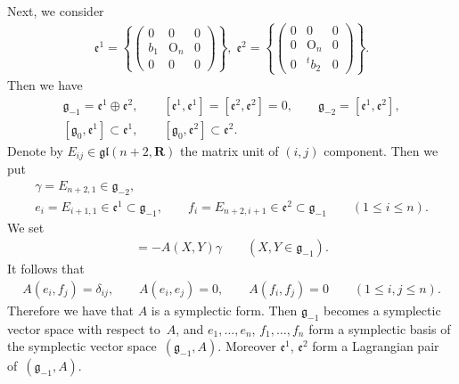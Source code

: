 Next, we consider
\begin{gather*}  \mathfrak{e}^1=\left\{{\begin{pmatrix}
                      0 & 0 & 0 \\
                      b_1 & \mathrm{O}_n & 0 \\
                      0 & 0 & 0
                    \end{pmatrix}}\right\}, \;
  \mathfrak{e}^2=\left\{{\begin{pmatrix}
                      0 & 0 & 0 \\
                      0 & \mathrm{O}_n & 0 \\
                      0 & {}^tb_2 & 0
                     \end{pmatrix}}\right\}.
\end{gather*}
Then we have
\begin{gather*}
\mathfrak{g}_{-1}=\mathfrak{e}^1\oplus \mathfrak{e}^2,\qquad
[\mathfrak{e}^1,\mathfrak{e}^1]=[\mathfrak{e}^2,\mathfrak{e}^2]=0,\qquad
\mathfrak{g}_{-2}=[\mathfrak{e}^1,\mathfrak{e}^2],
\\
[\mathfrak{g}_0,\mathfrak{e}^1]
       \subset \mathfrak{e}^1,\qquad
       [\mathfrak{g}_0,\mathfrak{e}^2]
       \subset \mathfrak{e}^2.
\end{gather*}
Denote by $E_{ij}\in \mathfrak{gl}(n+2,{\mathbf{R}})$ the matrix unit of
$(i,j)$ component. Then we put
\begin{gather*}
\gamma =E_{n+2,1}\in \mathfrak{g}_{-2},\\
e_i =E_{i+1,1}\in
\mathfrak{e}^1\subset \mathfrak{g}_{-1},\qquad f_i=E_{n+2,i+1}\in
\mathfrak{e}^2\subset \mathfrak{g}_{-1}\qquad (1\leq i\leq n).
\end{gather*}
We set
\begin{gather*}
[X,Y] = - A(X,Y)\gamma \qquad (X,Y\in \mathfrak{g}_{-1}).
\end{gather*}
It follows that
\begin{gather*}
A(e_i,f_j)={\delta}_{ij}, \qquad A(e_i, e_j) = 0, \qquad A(f_i, f_j) = 0 \qquad  (1 \leq i, j \leq n).
\end{gather*}
Therefore we have that $A$ is a symplectic form.
Then $\mathfrak{g}_{-1}$ becomes a symplectic vector space with respect to~$A$,  and
$e_1, \dots, e_n$, $f_1, \dots, f_n$ form a symplectic basis of the symplectic vector space~$(\mathfrak{g}_{-1},A)$.
Moreover
$\mathfrak{e}^1$, $\mathfrak{e}^2$ form a Lagrangian pair of~$(\mathfrak{g}_{-1}, A)$.

